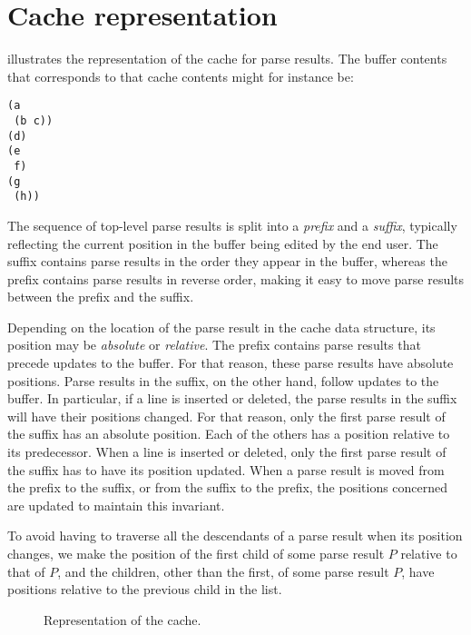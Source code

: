 \section{Cache representation}
\label{app-cache-representation}

 illustrates the representation of the cache for
parse results.  The buffer contents that corresponds to that cache
contents might for instance be:

\begin{verbatim}
(a
 (b c))
(d)
(e
 f)
(g 
 (h))
\end{verbatim}

The sequence of top-level parse results is split into a \emph{prefix}
and a \emph{suffix}, typically reflecting the current position in the
buffer being edited by the end user.  The suffix contains parse
results in the order they appear in the buffer, whereas the prefix
contains parse results in reverse order, making it easy to move parse
results between the prefix and the suffix.

Depending on the location of the parse result in the cache data
structure, its position may be \emph{absolute} or \emph{relative}.
The prefix contains parse results that precede updates to the buffer.
For that reason, these parse results have absolute positions.  Parse
results in the suffix, on the other hand, follow updates to the
buffer.  In particular, if a line is inserted or deleted, the parse
results in the suffix will have their positions changed.  For that
reason, only the first parse result of the suffix has an absolute
position.  Each of the others has a position relative to its
predecessor.  When a line is inserted or deleted, only the first parse
result of the suffix has to have its position updated.  When a parse
result is moved from the prefix to the suffix, or from the suffix to
the prefix, the positions concerned are updated to maintain this
invariant.

To avoid having to traverse all the descendants of a parse result when
its position changes, we make the position of the first child of some
parse result $P$ relative to that of $P$, and the children, other than
the first, of some parse result $P$, have positions relative to the
previous child in the list.

\begin{figure}
\begin{center}
\end{center}
\caption{\label{fig-cache}
Representation of the cache.}
\end{figure}


